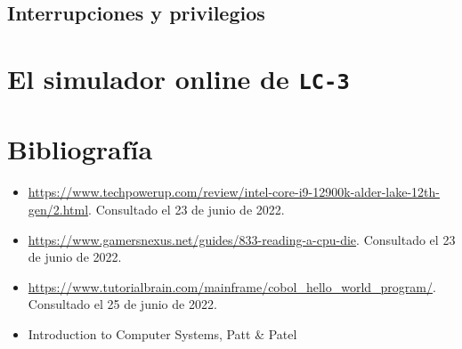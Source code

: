 \documentclass[a4paper, titlepage]{report}
\begin{document}
	\section{Interrupciones y privilegios} %
	
	\chapter{El simulador online de \texttt{LC-3}}
	
	\chapter{Bibliografía} %
	
	\begin{itemize}
		\item \url{https://www.techpowerup.com/review/intel-core-i9-12900k-alder-lake-12th-gen/2.html}. Consultado el 23 de junio de 2022.
		\item \url{https://www.gamersnexus.net/guides/833-reading-a-cpu-die}. Consultado el 23 de junio de 2022.
		\item \url{https://www.tutorialbrain.com/mainframe/cobol_hello_world_program/}. Consultado el 25 de junio de 2022.
		\item Introduction to Computer Systems, Patt \& Patel %
	\end{itemize}
	
\end{document}
